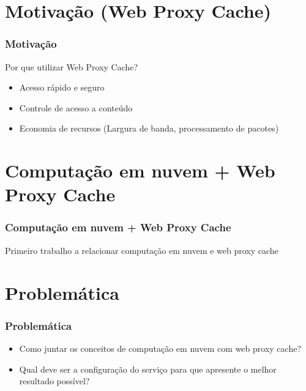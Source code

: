 \documentclass{beamer}
\begin{document}
    \section{Motivação (Web Proxy Cache)}
    \begin{frame}
      \frametitle{Motivação}
      Por que utilizar Web Proxy Cache?
      \begin{itemize}
       \item <2-> Acesso rápido e seguro
       \item <3-> Controle de acesso a conteúdo
       \item <4-> Economia de recursos (Largura de banda, processamento de pacotes)
      \end{itemize}
    \end{frame}
    \section{Computação em nuvem + Web Proxy Cache}
    \begin{frame}
     \frametitle{Computação em nuvem + Web Proxy Cache}
     Primeiro trabalho a relacionar computação em nuvem e web proxy cache
    \end{frame}
    \section{Problemática}
    \begin{frame}
     \frametitle{Problemática}
     \begin{itemize}
       \item Como juntar os conceitos de computação em nuvem com web proxy cache?
       \item Qual deve ser a configuração do serviço para que apresente o melhor resultado possível?
      \end{itemize}
    \end{frame}
\end{document}
